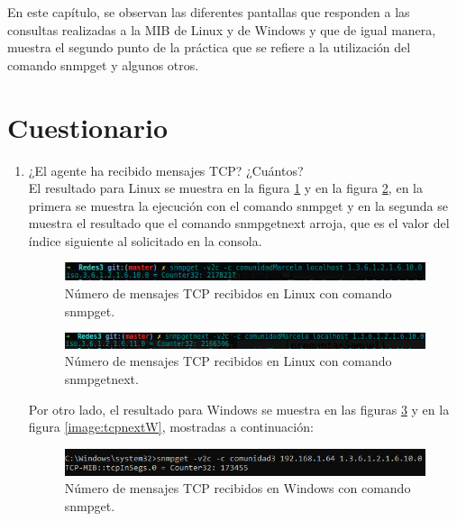 En este capítulo, se observan las diferentes pantallas que responden a las consultas realizadas a la MIB de Linux y de Windows y que de igual manera, muestra el segundo punto de la práctica que se refiere a la utilización del comando snmpget y algunos otros.
\section{Cuestionario}
\begin{enumerate}


\item ¿El agente ha recibido mensajes TCP? ¿Cuántos?\\
El resultado para Linux se muestra en la figura \ref{image:tcpget} y en la figura \ref{image:tcpnext}, en la primera se muestra la ejecución con el comando snmpget y en la segunda se muestra el resultado que el comando snmpgetnext arroja, que es el valor del índice siguiente al solicitado en la consola.

\FloatBarrier
\begin{figure}[htbp!]
		\centering
	\includegraphics[width=.9 \textwidth]{images/tcpget}
		\caption{Número de mensajes TCP recibidos en Linux con comando snmpget.}		\label{image:tcpget}
\end{figure}
\FloatBarrier


\FloatBarrier
\begin{figure}[htbp!]
		\centering
	\includegraphics[width=.9 \textwidth]{images/tcpnext}
		\caption{Número de mensajes TCP recibidos en Linux con comando snmpgetnext.}		\label{image:tcpnext}
\end{figure}
\FloatBarrier

Por otro lado, el resultado para Windows se muestra en las figuras \ref{image:tcpgetW} y en la figura \ref{image:tcpnextW}, mostradas a continuación:
\FloatBarrier
\begin{figure}[htbp!]
		\centering
	\includegraphics[width=.9 \textwidth]{images/tcpgetW}
		\caption{Número de mensajes TCP recibidos en Windows con comando snmpget.}		\label{image:tcpgetW}
\end{figure}
\FloatBarrier



\end{enumerate}
